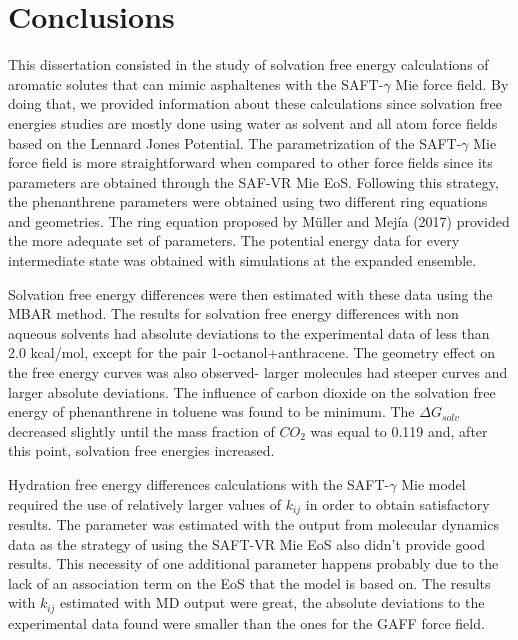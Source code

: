 \chapter{Conclusions} %

\label{Chapter6} %

This dissertation consisted in  the study of solvation free
energy calculations of aromatic solutes that can mimic asphaltenes with the SAFT-$\gamma$ 
Mie force field. By doing that, we provided information about these calculations since solvation free energies studies are mostly done using  water as solvent and all atom force fields based on the Lennard Jones Potential. The parametrization of the SAFT-$\gamma$  Mie force field is more straightforward
when compared to other force fields since its parameters are obtained through the SAF-VR
Mie EoS. Following this strategy, the phenanthrene parameters were obtained using two
different ring equations and geometries. The ring equation proposed by Müller and Mejía
(2017) provided the more adequate set of parameters.
The potential energy data for every intermediate state was obtained with simulations at the expanded ensemble. 

Solvation free energy differences were then
estimated with these data using the MBAR method. The results for solvation free energy differences with non aqueous solvents had absolute deviations to the experimental
data of less than 2.0 kcal/mol, except for the pair 1-octanol+anthracene. The geometry
effect on the free energy curves was also observed- larger molecules had steeper curves
and larger absolute deviations. The influence of carbon dioxide on the solvation free
energy of phenanthrene in toluene was found to be minimum. The $\Delta G_{solv}$ decreased slightly until the mass fraction of $CO_{2}$ was equal to 0.119 and, after this point, solvation free
energies increased. 

Hydration free energy differences calculations with the SAFT-$\gamma$ Mie model
required the use of relatively larger values of $k_{ij}$ in order to obtain satisfactory results.
The parameter was estimated with the output from molecular dynamics data as
the strategy of using the SAFT-VR Mie EoS also didn’t provide good results. This
necessity of one additional parameter happens probably due to the lack of an association term
on the EoS that the model is based on. The results with $k_{ij}$ estimated with MD output
were great, the absolute deviations to the experimental data found were smaller than
the ones for the GAFF force field.

